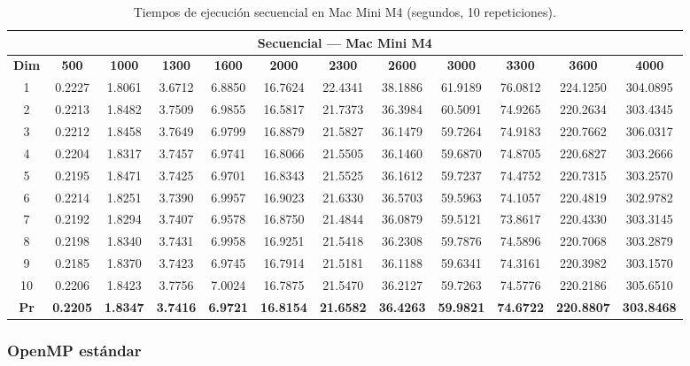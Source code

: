 \documentclass{article}
\begin{document}
\begin{table}[H]
\centering
\tiny
\begin{tabular}{|c|c|c|c|c|c|c|c|c|c|c|c|}
\hline
\multicolumn{12}{|c|}{\textbf{Secuencial --- Mac Mini M4}} \\
\hline
\textbf{Dim} & \textbf{500} & \textbf{1000} & \textbf{1300} & \textbf{1600} & \textbf{2000} & \textbf{2300} & \textbf{2600} & \textbf{3000} & \textbf{3300} & \textbf{3600} & \textbf{4000} \\
\hline
1  & 0.2227 & 1.8061 & 3.6712 & 6.8850 & 16.7624 & 22.4341 & 38.1886 & 61.9189 & 76.0812 & 224.1250 & 304.0895 \\
2  & 0.2213 & 1.8482 & 3.7509 & 6.9855 & 16.5817 & 21.7373 & 36.3984 & 60.5091 & 74.9265 & 220.2634 & 303.4345 \\
3  & 0.2212 & 1.8458 & 3.7649 & 6.9799 & 16.8879 & 21.5827 & 36.1479 & 59.7264 & 74.9183 & 220.7662 & 306.0317 \\
4  & 0.2204 & 1.8317 & 3.7457 & 6.9741 & 16.8066 & 21.5505 & 36.1460 & 59.6870 & 74.8705 & 220.6827 & 303.2666 \\
5  & 0.2195 & 1.8471 & 3.7425 & 6.9701 & 16.8343 & 21.5525 & 36.1612 & 59.7237 & 74.4752 & 220.7315 & 303.2570 \\
6  & 0.2214 & 1.8251 & 3.7390 & 6.9957 & 16.9023 & 21.6330 & 36.5703 & 59.5963 & 74.1057 & 220.4819 & 302.9782 \\
7  & 0.2192 & 1.8294 & 3.7407 & 6.9578 & 16.8750 & 21.4844 & 36.0879 & 59.5121 & 73.8617 & 220.4330 & 303.3145 \\
8  & 0.2198 & 1.8340 & 3.7431 & 6.9958 & 16.9251 & 21.5418 & 36.2308 & 59.7876 & 74.5896 & 220.7068 & 303.2879 \\
9  & 0.2185 & 1.8370 & 3.7423 & 6.9745 & 16.7914 & 21.5181 & 36.1188 & 59.6341 & 74.3161 & 220.3982 & 303.1570 \\
10 & 0.2206 & 1.8423 & 3.7756 & 7.0024 & 16.7875 & 21.5470 & 36.2127 & 59.7263 & 74.5776 & 220.2186 & 305.6510 \\
\hline
\textbf{Pr} & \textbf{0.2205} & \textbf{1.8347} & \textbf{3.7416} & \textbf{6.9721} & \textbf{16.8154} & \textbf{21.6582} & \textbf{36.4263} & \textbf{59.9821} & \textbf{74.6722} & \textbf{220.8807} & \textbf{303.8468} \\
\hline
\end{tabular}
\caption{Tiempos de ejecución secuencial en Mac Mini M4 (segundos, 10 repeticiones).}
\label{tab:sec_mac}
\end{table}

\subsubsection{OpenMP estándar}
\end{document}
